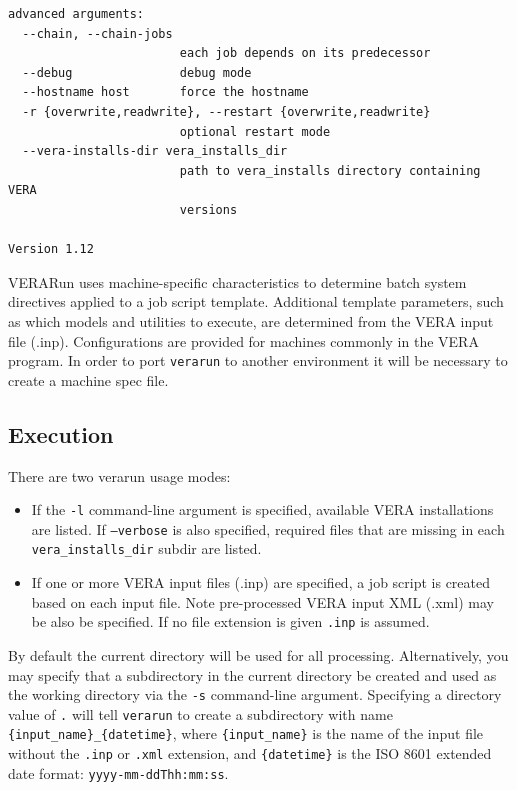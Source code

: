 \begin{Verbatim}[fontsize=\small]
advanced arguments:
  --chain, --chain-jobs
                        each job depends on its predecessor
  --debug               debug mode
  --hostname host       force the hostname
  -r {overwrite,readwrite}, --restart {overwrite,readwrite}
                        optional restart mode
  --vera-installs-dir vera_installs_dir
                        path to vera_installs directory containing VERA
                        versions

Version 1.12
\end{Verbatim}

VERARun uses machine-specific characteristics to determine batch system
directives applied to a job script template.  Additional template parameters,
such as which models and utilities to execute, are determined from the VERA
input file (.inp).  Configurations are provided for machines commonly in the
VERA program.  In order to port \texttt{verarun} to another environment it will be
necessary to create a machine spec file.

\subsection{Execution}

There are two verarun usage modes:
\begin{itemize}
    \item If the \texttt{-l} command-line argument is specified, available VERA installations
  are listed.  If \texttt{--verbose} is also specified, required files that are
  missing in each \texttt{vera\_installs\_dir} subdir are listed.
  \item If one or more VERA input files (.inp) are specified, a job script is created
  based on each input file.  Note pre-processed VERA input XML (.xml) may be
  also be specified.  If no file extension is given \texttt{.inp} is assumed.
\end{itemize}

By default the current directory will be used for all processing.
Alternatively, you may specify that a subdirectory in the current directory be
created and used as the working directory via the \texttt{-s} command-line argument.
Specifying a directory value of \texttt{.} will tell \texttt{verarun} to create a subdirectory with
name \texttt{\{input\_name\}\_\{datetime\}}, where \texttt{\{input\_name\}} is the name of the input file
without the \texttt{.inp} or \texttt{.xml} extension, and \texttt{\{datetime\}} is the ISO 8601 extended
date format: \texttt{yyyy-mm-ddThh:mm:ss}.

